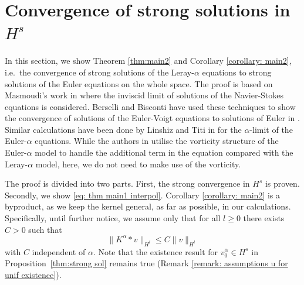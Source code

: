 \documentclass{amsart}
\begin{document}
\section{Convergence of strong solutions in $H^s$}  
In this section, we show Theorem \ref{thm:main2} and Corollary \ref{corollary: main2}, i.e.\ the convergence of strong solutions of the Leray-$\alpha$ equations to strong solutions of the Euler equations on the whole space. The proof is based on Masmoudi's work in \cite{Masmoudi.2007} where the inviscid limit of solutions of the Navier-Stokes equations is considered. Berselli and Bisconti have used these techniques to show the convergence of solutions of the Euler-Voigt equations to solutions of Euler in \cite{Berselli.2012}. Similar calculations have been done by Linshiz and Titi in \cite{Linshiz.2010} for the $\alpha$-limit of the Euler-$\alpha$ equations. While the authors in \cite{Linshiz.2010} utilise the vorticity structure of the Euler-$\alpha$ model to handle the additional term in the equation compared with the Leray-$\alpha$ model, here, we do not need to make use of the vorticity.

The proof is divided into two parts. First, the strong convergence in $H^s$ is proven. Secondly, we show \eqref{eq: thm main1 interpol}. Corollary \ref{corollary: main2} is a byproduct, as we keep the kernel general, as far as possible, in our calculations. Specifically, until further notice, we assume only that for all $l \geq 0$ there exists $C>0$ such that
\begin{equation}
\label{eq: kernel assumption}
    \|K^{\alpha}*v\|_{H^l} \leq C \|v\|_{H^l} 
\end{equation}
with $C$ independent of $\alpha$. Note that the existence result for $v_0^{\alpha}\in H^s$ in Proposition~\ref{thm:strong sol} remains true (Remark \ref{remark: assumptions u for unif existence}).
\end{document}
